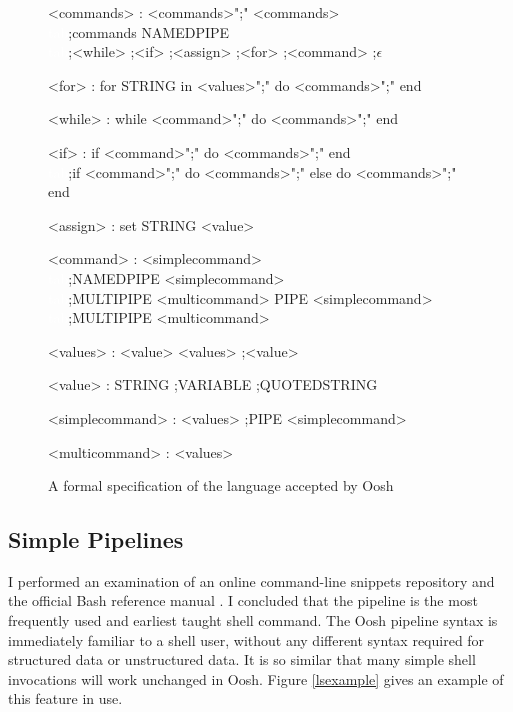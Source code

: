 \documentclass[12pt,twoside,notitlepage]{report}
\begin{document}
\begin{figure}[h]
\label{grammar}
\caption{A formal specification of the language accepted by Oosh}
\begin{grammar}
<commands> : <commands>";" <commands>\\
\textcolor{white}{tab};commands NAMEDPIPE\\
\textcolor{white}{tab};<while> ;<if> ;<assign> ;<for> ;<command> ;$\epsilon$

<for> : for STRING in <values>";" do <commands>";" end

<while> : while <command>";" do <commands>";" end

<if> : if <command>";" do <commands>";" end\\
\textcolor{white}{tab};if <command>";" do <commands>";" else do <commands>";" end

<assign> : set STRING <value>

<command> : <simplecommand>\\
\textcolor{white}{tab};NAMEDPIPE <simplecommand>\\
\textcolor{white}{tab};MULTIPIPE <multicommand> PIPE <simplecommand>\\
\textcolor{white}{tab};MULTIPIPE <multicommand>

<values> : <value> <values> ;<value>

<value> : STRING ;VARIABLE ;QUOTEDSTRING

<simplecommand> : <values>
;PIPE <simplecommand>
    
<multicommand> : <values>
\end{grammar}
\end{figure}

\subsection{Simple Pipelines}

I performed an examination of an online command-line snippets
repository \cite{clifu} and the official Bash reference manual
\cite{bashman}. I concluded that the pipeline is the most frequently
used and earliest taught shell command. The Oosh pipeline syntax is
immediately familiar to a shell user, without any different syntax
required for structured data or unstructured data. It is so similar
that many simple shell invocations will work unchanged in Oosh. Figure
\ref{lsexample} gives an example of this feature in use.
\end{document}
